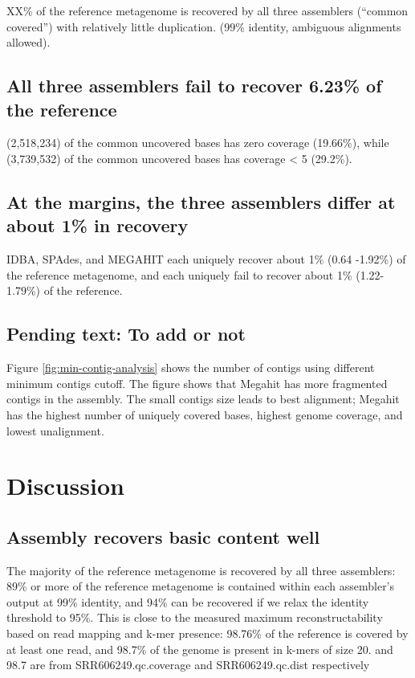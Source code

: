 \documentclass[10pt,a4paper,twocolumn]{article}
\begin{document}
XX\% of the reference metagenome is recovered by all three assemblers
(“common covered”) with relatively little duplication. (99\% identity,
ambiguous alignments allowed).
 
\subsection*{All three assemblers fail to recover 6.23\%  of the reference}
  

(2,518,234) of the common uncovered bases has zero coverage (19.66\%),
while (3,739,532) of the common uncovered bases has coverage \textless
5 (29.2\%).

\subsection*{At the margins, the three assemblers differ at about 1\% in recovery}
IDBA, SPAdes, and MEGAHIT each uniquely recover about 1\% (0.64
-1.92\%) of the reference metagenome, and each uniquely fail to
recover about 1\% (1.22-1.79\%) of the reference.

\subsection*{Pending text: To add or not}
Figure \ref{fig:min-contig-analysis} shows the number of contigs using
different minimum contigs cutoff.  The figure shows that Megahit
\cite{megahit} has more fragmented contigs in the assembly. The small
contigs size leads to best alignment; Megahit has the highest number
of uniquely covered bases, highest genome coverage, and lowest
unalignment.

\section*{Discussion}
\subsection*{Assembly recovers basic content well}
The majority of the reference metagenome is recovered by all three
assemblers: 89\% or more of the reference metagenome is contained
within each assembler’s output at 99\% identity, and 94\% can be
recovered if we relax the identity threshold to 95\%.  This is close
to the measured maximum reconstructability based on read mapping and
k-mer presence: 98.76\% of the reference is covered by at least one
read, and 98.7\% of the genome is present in k-mers of size 20. %
and 98.7 are from SRR606249.qc.coverage and SRR606249.qc.dist
respectively
\end{document}
